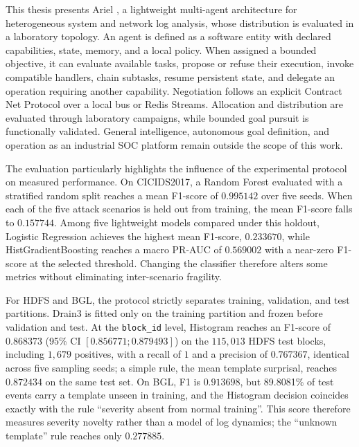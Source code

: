 
This thesis presents Ariel \logminer{}, a lightweight multi-agent architecture
for heterogeneous system and network log analysis, whose distribution is
evaluated in a laboratory topology. An agent is defined as a software entity
with declared capabilities, state, memory, and a local policy. When assigned
a bounded objective, it can evaluate available tasks, propose or refuse their
execution, invoke compatible handlers, chain subtasks, resume persistent state,
and delegate an operation requiring another capability. Negotiation follows an
explicit Contract Net Protocol over a local bus or Redis Streams. Allocation
and distribution are evaluated through laboratory campaigns, while bounded
goal pursuit is functionally validated. General intelligence, autonomous goal
definition, and operation as an industrial SOC platform remain outside the
scope of this work.

The evaluation particularly highlights the influence of the experimental
protocol on measured performance. On CICIDS2017, a Random Forest evaluated
with a stratified random split reaches a mean F1-score of $0.995142$ over five
seeds. When each of the five attack scenarios is held out from training, the
mean F1-score falls to $0.157744$. Among five lightweight models compared
under this holdout, Logistic Regression achieves the highest mean F1-score,
$0.233670$, while HistGradientBoosting reaches a macro PR-AUC of $0.569002$
with a near-zero F1-score at the selected threshold. Changing the classifier
therefore alters some metrics without eliminating inter-scenario fragility.

For HDFS and BGL, the protocol strictly separates training, validation, and
test partitions. Drain3 is fitted only on the training partition and frozen
before validation and test. At the \texttt{block\_id} level, Histogram reaches
an F1-score of $0.868373$ (95\% CI $[0.856771;0.879493]$) on the
$115{,}013$ HDFS test blocks, including $1{,}679$ positives, with a recall of
$1$ and a precision of $0.767367$, identical across five sampling seeds; a simple rule, the mean template surprisal, reaches $0.872434$ on the same test set. On
BGL, F1 is $0.913698$, but 89.8081\% of test events carry a template unseen
in training, and the Histogram decision coincides exactly with the rule
``severity absent from normal training''. This score therefore measures
severity novelty rather than a model of log dynamics; the ``unknown
template'' rule reaches only $0.277885$.

